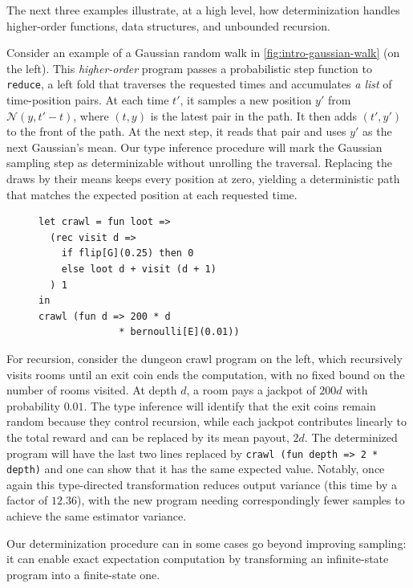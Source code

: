 The next three examples illustrate, at a high level, how determinization handles
higher-order functions, data structures, and unbounded recursion.

Consider an example of a Gaussian random walk in
\cref{fig:intro-gaussian-walk} (on the left).
This {\em higher-order} program passes a probabilistic step function to
\texttt{reduce}, a left fold that traverses the requested times
and accumulates {\em a list} of time-position pairs.
At each time $t'$, it samples a new position $y'$ from
$\mathcal N(y,t'-t)$, where $(t,y)$ is the latest pair in the path. It then adds $(t',y')$ to the front of the path. At the next step, it reads that pair and uses $y'$ as the next Gaussian's mean. Our type inference procedure will mark the Gaussian sampling
step as determinizable without unrolling the traversal. 
Replacing the draws by their means keeps every position at zero,
yielding a deterministic path that matches the expected position
at each requested time. 



\begin{figure}
\vspace{-1.75em}
\begin{lstlisting}[xleftmargin=0em]
let crawl = fun loot =>
  (rec visit d =>
    if flip[G](0.25) then 0
    else loot d + visit (d + 1)
  ) 1
in
crawl (fun d => 200 * d 
              * bernoulli[E](0.01))
\end{lstlisting}
\vspace{-1.75em}
\end{figure}
\noindent For recursion, consider the dungeon crawl program on the left, which recursively visits
rooms until an exit coin ends the computation, with no fixed
bound on the number of rooms visited.
 At depth $d$, a room pays a jackpot of $200d$ with probability
$0.01$. The type inference will identify that the exit coins remain random because they control
recursion, while each jackpot contributes linearly to the total
reward and can be replaced by its mean payout, $2d$. The determinized program will have the last two lines replaced by \lstinline{crawl (fun depth => 2 * depth)} and one can show that it has the same expected value. Notably, once again this type-directed transformation reduces output
variance (this time by a factor of $12.36$), with the new program needing correspondingly fewer samples to achieve the same estimator variance.

Our determinization procedure can in some cases go beyond improving sampling: it can enable exact expectation computation by transforming an infinite-state program into a finite-state one.


